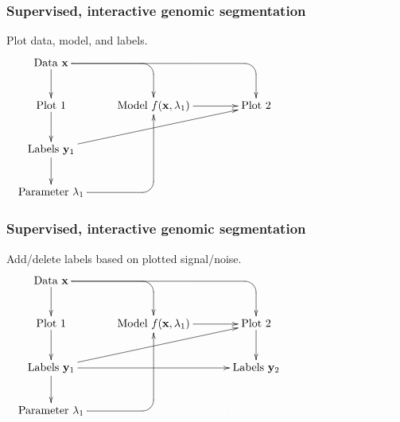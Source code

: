 \documentclass{beamer}
\begin{document}
\begin{frame}
  \frametitle{Supervised, interactive genomic segmentation}
  Plot data, model, and labels.
  \small
  \begin{displaymath}
  \xymatrix{
    \text{Data $\mathbf x$}
    \ar `[r] [dr] 
    \ar `r[rr] [drr] 
    \ar [d]
    & \text{ }
    & \text{ }
    & \text{ }
    \\
    \text{Plot 1} 
    \ar [d]
    & 
    \text{Model $f(\mathbf x, \lambda_1)$} 
    \ar [r]
    &
    \text{Plot 2} 
    & 
    \color{white}{\text{Model $f(\mathbf x, \lambda_2)$} }
    \\
    \text{Labels $\mathbf y_1$}       
    \ar [d]
    \ar [rru]
    &
    &
    \color{white}{\text{Labels $\mathbf y_2$}}
    \\
    \text{Parameter $\lambda_1$} 
    \ar `r[ruu] [ruu]
    & \text{ }
    & 
    \color{white}{\text{Parameter $\lambda_2$}}
  }
  \end{displaymath}
\end{frame}

\begin{frame}
  \frametitle{Supervised, interactive genomic segmentation}
  Add/delete labels based on plotted signal/noise.
  \small
  \begin{displaymath}
  \xymatrix{
    \text{Data $\mathbf x$}
    \ar `[r] [dr] 
    \ar `r[rr] [drr] 
    \ar [d]
    & \text{ }
    & \text{ }
    & \text{ }
    \\
    \text{Plot 1} 
    \ar [d]
    & 
    \text{Model $f(\mathbf x, \lambda_1)$} 
    \ar [r]
    &
    \text{Plot 2} 
    \ar [d]
    & 
    \color{white}{\text{Model $f(\mathbf x, \lambda_2)$} }
    \\
    \text{Labels $\mathbf y_1$}       
    \ar [d]
    \ar [rr]
    \ar [rru]
    &
    &
    \text{Labels $\mathbf y_2$}
    \\
    \text{Parameter $\lambda_1$} 
    \ar `r[ruu] [ruu]
    & \text{ }
    & 
    \color{white}{\text{Parameter $\lambda_2$}}
  }
  \end{displaymath}
\end{frame}
\end{document}
